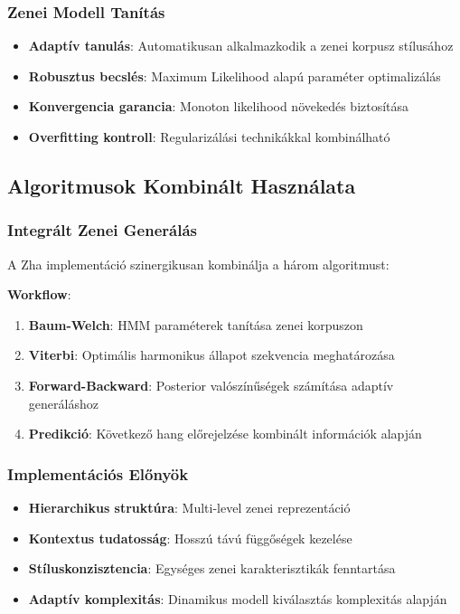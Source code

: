 \subsubsection{Zenei Modell Tanítás}

\begin{itemize}
    \item \textbf{Adaptív tanulás}: Automatikusan alkalmazkodik a zenei korpusz stílusához
    \item \textbf{Robusztus becslés}: Maximum Likelihood alapú paraméter optimalizálás
    \item \textbf{Konvergencia garancia}: Monoton likelihood növekedés biztosítása
    \item \textbf{Overfitting kontroll}: Regularizálási technikákkal kombinálható
\end{itemize}

\subsection{Algoritmusok Kombinált Használata}

\subsubsection{Integrált Zenei Generálás}

A Zha implementáció szinergikusan kombinálja a három algoritmust:

\textbf{Workflow}:
\begin{enumerate}
    \item \textbf{Baum-Welch}: HMM paraméterek tanítása zenei korpuszon
    \item \textbf{Viterbi}: Optimális harmonikus állapot szekvencia meghatározása
    \item \textbf{Forward-Backward}: Posterior valószínűségek számítása adaptív generáláshoz
    \item \textbf{Predikció}: Következő hang előrejelzése kombinált információk alapján
\end{enumerate}

\subsubsection{Implementációs Előnyök}

\begin{itemize}
    \item \textbf{Hierarchikus struktúra}: Multi-level zenei reprezentáció
    \item \textbf{Kontextus tudatosság}: Hosszú távú függőségek kezelése
    \item \textbf{Stíluskonzisztencia}: Egységes zenei karakterisztikák fenntartása
    \item \textbf{Adaptív komplexitás}: Dinamikus modell kiválasztás komplexitás alapján
\end{itemize}

